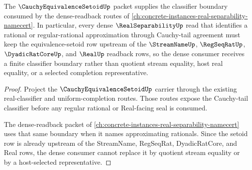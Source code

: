\begin{proposition}
\label{prop:cauchy-equivalence-setoid-real-separability-dense-consumer-route}
The $\CauchyEquivalenceSetoidUp$ packet supplies the classifier boundary consumed by the dense-readback routes of \autoref{ch:concrete-instances-real-separability-namecert}. In particular, every dense $\RealSeparabilityUp$ read that identifies a rational or regular-rational approximation through Cauchy-tail agreement must keep the equivalence-setoid row upstream of the $\StreamNameUp$, $\RegSeqRatUp$, $\DyadicRatCoreUp$, and $\RealUp$ readback rows, so the dense consumer receives a finite classifier boundary rather than quotient stream equality, host real equality, or a selected completion representative.
\end{proposition}
\begin{proof}
Project the $\CauchyEquivalenceSetoidUp$ carrier through the existing real-classifier and uniform-completion routes. Those routes expose the Cauchy-tail classifier before any regular rational or Real-facing seal is consumed.

The dense-readback packet of \autoref{ch:concrete-instances-real-separability-namecert} uses that same boundary when it names approximating rationals. Since the setoid row is already upstream of the StreamName, RegSeqRat, DyadicRatCore, and Real rows, the dense consumer cannot replace it by quotient stream equality or by a host-selected representative.
\end{proof}
